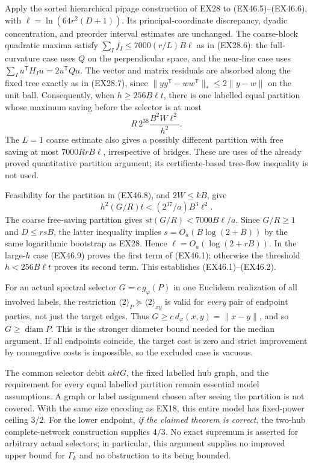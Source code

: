 Apply the sorted hierarchical pipage construction of EX28 to
(EX46.5)--(EX46.6), with
$\ell=\ln(64r^2(D+1))$. Its principal-coordinate discrepancy,
dyadic concentration, and preorder interval estimates are unchanged.
The coarse-block quadratic maxima satisfy
$\sum_I f_I\le7000(r/L)B\ell$ as in (EX28.6): the full-curvature
case uses $Q$ on the perpendicular space, and the near-line case
uses $\sum_Iu^{\mathsf T}H_Iu=2u^{\mathsf T}Qu$.
The vector and matrix residuals are absorbed along the fixed tree
exactly as in (EX28.7), since
$\|yy^{\mathsf T}-ww^{\mathsf T}\|_*\le2\|y-w\|$
on the unit ball. Consequently, when $h\ge256B\ell t$, there is
one labelled equal partition whose maximum saving before the selector
is at most
\[
                        R\,2^{38}\frac{B^2W\ell^2}{h^2}.
 \tag{EX46.8}
\]
The $L=1$ coarse estimate also gives a possibly different partition
with free saving at most $7000RrB\ell$, irrespective of bridges.
These are uses of the already proved quantitative partition argument;
its certificate-based tree-flow inequality is not used.

Feasibility for the partition in (EX46.8), and $2W\le kB$, give
\[
                h^2(G/R)t<(2^{37}/a)B^3\ell^2.
 \tag{EX46.9}
\]
The coarse free-saving partition gives
$st(G/R)<7000B\ell/a$. Since $G/R\ge1$ and $D\le rsB$,
the latter inequality implies
$s=O_a(B\log(2+B))$ by the same logarithmic bootstrap as EX28.
Hence $\ell=O_a(\log(2+rB))$. In the large-$h$ case (EX46.9)
proves the first term of (EX46.1); otherwise the threshold
$h<256B\ell t$ proves its second term. This establishes
(EX46.1)--(EX46.2).

For an actual spectral selector $G=c\,g_\varphi(P)$ in one
Euclidean realization of all involved labels, the restriction
$\langle2\rangle_P\succeq\langle2\rangle_{xy}$ is valid for
\emph{every} pair of endpoint parties, not just the target edges.
Thus $G\ge c\,d_\varphi(x,y)=\|x-y\|$, and so
$G\ge\operatorname{diam}P$. This is the stronger diameter bound
needed for the median argument. If all endpoints coincide, the
target cost is zero and strict improvement by nonnegative costs
is impossible, so the excluded case is vacuous.

The common selector debit $aktG$, the fixed labelled hub graph,
and the requirement for every equal labelled partition remain
essential model assumptions. A graph or label assignment chosen
after seeing the partition is not covered. With the same size
encoding as EX18, this entire model has fixed-power ceiling $3/2$.
For the lower endpoint, \emph{if the claimed theorem is correct},
the two-hub complete-network construction supplies $4/3$.
No exact supremum is asserted for arbitrary actual selectors;
in particular, this argument supplies no improved upper bound
for $\Gamma_k$ and no obstruction to its being bounded.


